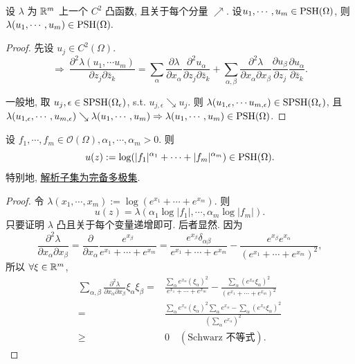 \begin{corollary}
  设 $\lambda$  为 ${\mathbb R}^m$  上一个 $C^2$  凸函数, 且关于每个分量 $\nearrow $. 设$u_1,\cdots ,u_m \in \operatorname{PSH}(\Omega )$,  则 
  $ \lambda (u_1,\cdots ,u_m) \in \operatorname{PSH}(\Omega ) .$
\end{corollary}
\begin{proof}
  先设 $u_j \in C^2(\Omega )$.
  $$ \Rightarrow ~ \frac{\partial^2 \lambda (u_1,\cdots u_m) }{\partial z_j \partial \bar{z}_k} = \sum_{\alpha }^{}\frac{\partial \lambda }{\partial x_{\alpha }} \frac{\partial^2 u_{\alpha } }{\partial z_j \partial \bar{z}_k}+\sum_{\alpha ,\beta } \frac{\partial^2 \lambda  }{\partial x_{\alpha } \partial x_{\beta }} \frac{\partial u_{\beta }}{\partial z_j} \frac{\partial u_{\alpha }}{\partial \bar{z}_k}.$$ 

  一般地, 取 $u_j,\epsilon \in \operatorname{SPSH}(\Omega _{\epsilon })$, s.t. $u_{j,\epsilon } \searrow u_j$. 则 $\lambda (u_{1,\epsilon},\cdots u_{m,\epsilon } ) \in \operatorname{SPSH} (\Omega _{\epsilon })$, 且 $\lambda (u_{1,\epsilon},\cdots, u_{m,\epsilon } ) \searrow \lambda (u_1,\cdots ,u_m) \Rightarrow \lambda (u_{1},\cdots, u_{m } )\in \operatorname{PSH}(\Omega )$.    
\end{proof}

\begin{example}
  设 $f_1, \cdots ,f_m \in \mathcal{O}(\Omega ), \alpha _1, \cdots ,\alpha _m >0$. 则 
  $$ u(z):=\log(|f_1|^{\alpha _1}+\cdots +|f_m|^{\alpha _m}) \in \operatorname{PSH}(\Omega ).$$
  特别地, \underline{解析子集为完备多极集}. 
\end{example}
\begin{proof}
  令 $\lambda (x_1,\cdots ,x_m):=\log(e^{x_1}+ \cdots +e^{x_m})$. 则 
  $$ u(z)=\lambda (\alpha _1 \log |f_1|,\cdots ,\alpha _m \log|f_m|) .$$ 
  只要证明 $\lambda $ 凸且关于每个变量递增即可. 
  后者显然. 
  因为
  $$ \frac{\partial^2 \lambda  }{\partial x_{\alpha } \partial x_{\beta }}=\frac{\partial }{\partial x_{\alpha }}\frac{e^{x_{\beta }}}{e^{x_1}+ \cdots +e^{x_m}}= \frac{e^{x_{\beta }}\delta _{\alpha \beta }}{e^{x_1}+ \cdots +e^{x_m}}-\frac{e^{x_{\beta }}e^{x_{\alpha }}}{(e^{x_1}+ \cdots +e^{x_m})^2},$$ 
  所以 $\forall \xi \in {\mathbb R}^m$, 
  $$ \begin{aligned}
   \sum_{\alpha ,\beta }^{} \frac{\partial^2 \lambda  }{\partial x_{\alpha } \partial x_{\beta }} \xi _{\alpha }\xi _{\beta }=& \frac{\sum_{\alpha }^{} e^{x_{\alpha}}(\xi _{\alpha })^2}{e^{x_1}+ \cdots +e^{x_m}}-\frac{\sum_{\alpha }^{}(e^{x_{\alpha }} \xi _{\alpha })^2}{(e^{x_1}+ \cdots +e^{x_m})^2}\\
    =& \frac{\sum_{\alpha }^{} e^{x_{\alpha}}(\xi _{\alpha })^2 \sum_{\alpha }^{} e^{x_{\alpha }}-\sum_{\alpha }^{}(e^{x_{\alpha }} \xi _{\alpha })^2}{\left(\sum_{\alpha }^{} e^{x_{\alpha }} \right)^2}\\
    \geq & 0 \quad (\text{Schwarz 不等式}).
  \end{aligned}  $$ 
\end{proof}

